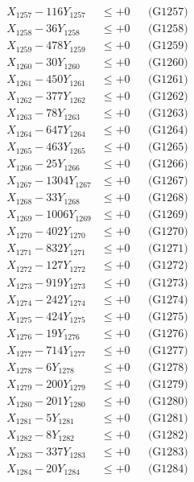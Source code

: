\documentclass[a4paper,10pt]{article}
\begin{document}
{\begin{align}
X_{1257} - 116Y_{1257} &\leq +0 && \text{(G1257)} \\
X_{1258} - 36Y_{1258} &\leq +0 && \text{(G1258)} \\
X_{1259} - 478Y_{1259} &\leq +0 && \text{(G1259)} \\
X_{1260} - 30Y_{1260} &\leq +0 && \text{(G1260)} \\
\allowbreak
X_{1261} - 450Y_{1261} &\leq +0 && \text{(G1261)} \\
X_{1262} - 377Y_{1262} &\leq +0 && \text{(G1262)} \\
X_{1263} - 78Y_{1263} &\leq +0 && \text{(G1263)} \\
X_{1264} - 647Y_{1264} &\leq +0 && \text{(G1264)} \\
X_{1265} - 463Y_{1265} &\leq +0 && \text{(G1265)} \\
X_{1266} - 25Y_{1266} &\leq +0 && \text{(G1266)} \\
X_{1267} - 1304Y_{1267} &\leq +0 && \text{(G1267)} \\
X_{1268} - 33Y_{1268} &\leq +0 && \text{(G1268)} \\
X_{1269} - 1006Y_{1269} &\leq +0 && \text{(G1269)} \\
X_{1270} - 402Y_{1270} &\leq +0 && \text{(G1270)} \\
\allowbreak
X_{1271} - 832Y_{1271} &\leq +0 && \text{(G1271)} \\
X_{1272} - 127Y_{1272} &\leq +0 && \text{(G1272)} \\
X_{1273} - 919Y_{1273} &\leq +0 && \text{(G1273)} \\
X_{1274} - 242Y_{1274} &\leq +0 && \text{(G1274)} \\
X_{1275} - 424Y_{1275} &\leq +0 && \text{(G1275)} \\
X_{1276} - 19Y_{1276} &\leq +0 && \text{(G1276)} \\
X_{1277} - 714Y_{1277} &\leq +0 && \text{(G1277)} \\
X_{1278} - 6Y_{1278} &\leq +0 && \text{(G1278)} \\
X_{1279} - 200Y_{1279} &\leq +0 && \text{(G1279)} \\
X_{1280} - 201Y_{1280} &\leq +0 && \text{(G1280)} \\
\allowbreak
X_{1281} - 5Y_{1281} &\leq +0 && \text{(G1281)} \\
X_{1282} - 8Y_{1282} &\leq +0 && \text{(G1282)} \\
X_{1283} - 337Y_{1283} &\leq +0 && \text{(G1283)} \\
X_{1284} - 20Y_{1284} &\leq +0 && \text{(G1284)} \\

\end{align}}
\end{document}
